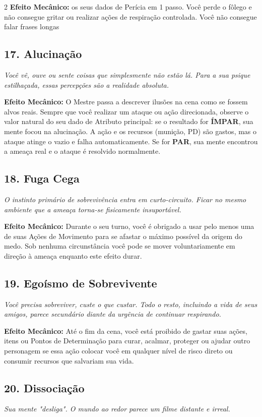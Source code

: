\documentclass[a4paper,11pt,openany]{book}
\begin{document}
\begin{multicols}{2}
\textbf{Efeito Mecânico:} os seus dados de Perícia em 1 passo. Você perde o fôlego e não consegue gritar ou realizar ações de respiração controlada. Você não consegue falar frases longas

\subsection*{17. Alucinação}
\textit{Você vê, ouve ou sente coisas que simplesmente não estão lá. Para a sua psique estilhaçada, essas percepções são a realidade absoluta.}

\textbf{Efeito Mecânico:} O Mestre passa a descrever ilusões na cena como se fossem alvos reais. Sempre que você realizar um ataque ou ação direcionada, observe o valor natural do seu dado de Atributo principal: se o resultado for \textbf{ÍMPAR}, sua mente focou na alucinação. A ação e os recursos (munição, PD) são gastos, mas o ataque atinge o vazio e falha automaticamente. Se for \textbf{PAR}, sua mente encontrou a ameaça real e o ataque é resolvido normalmente.

\subsection*{18. Fuga Cega}
\textit{O instinto primário de sobrevivência entra em curto-circuito. Ficar no mesmo ambiente que a ameaça torna-se fisicamente insuportável.}

\textbf{Efeito Mecânico:} Durante o seu turno, você é obrigado a usar pelo menos uma de suas Ações de Movimento para se afastar o máximo possível da origem do medo. Sob nenhuma circunstância você pode se mover voluntariamente em direção à ameaça enquanto este efeito durar.

\subsection*{19. Egoísmo de Sobrevivente}
\textit{Você precisa sobreviver, custe o que custar. Todo o resto, incluindo a vida de seus amigos, parece secundário diante da urgência de continuar respirando.}

\textbf{Efeito Mecânico:} Até o fim da cena, você está proibido de gastar suas ações, itens ou Pontos de Determinação para curar, acalmar, proteger ou ajudar outro personagem se essa ação colocar você em qualquer nível de risco direto ou consumir recursos que salvariam sua vida.




\subsection*{20. Dissociação}
\textit{Sua mente "desliga". O mundo ao redor parece um filme distante e irreal.}


\end{multicols}
\end{document}
